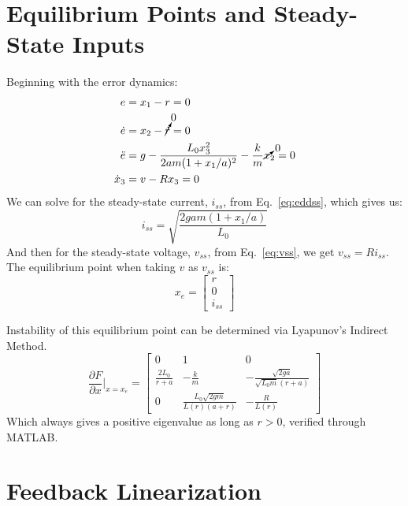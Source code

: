 \documentclass{article}
\begin{document}
\section{Equilibrium Points and Steady-State Inputs}
Beginning with the error dynamics:
\begin{align}
    e &= x_1 - r  = 0 \nonumber \\
    \dot{e} &= x_2 - \cancelto{0}{\dot{r}} = 0 \nonumber \\
    \ddot{e} &= g - \frac{L_0x_3^2}{2am(1 + x_1/a)^2} - \frac{k}{m}\cancelto{0}{x}_2 = 0 \label{eq:eddss} \\
    \dot{x}_3 &= v - Rx_3 = 0 \label{eq:vss}
\end{align}
We can solve for the steady-state current, $i_{ss}$, from Eq.~\ref{eq:eddss}, which gives us:
\begin{equation}
    i_{ss} = \sqrt{\frac{2gam(1+x_1/a)}{L_0}}
\end{equation}
And then for the steady-state voltage, $v_{ss}$, from Eq.~\ref{eq:vss}, we get $v_{ss} = Ri_{ss}$.
The equilibrium point when taking $v$ as $v_{ss}$ is:
\begin{equation}
    x_e = \begin{bmatrix} r \\ 0 \\ i_{ss} \end{bmatrix} \nonumber
\end{equation}
\par
\noindent
Instability of this equilibrium point can be determined via Lyapunov's Indirect Method.
\begin{equation*}
    \frac{\partial F}{\partial x}\Bigr|_{x = x_e} = \begin{bmatrix} 0 & 1 & 0 \\
                                                                    \frac{2L_0}{r+a} & -\frac{k}{m} & -\frac{\sqrt{2ga}}{\sqrt{L_0m}(r+a)} \\
                                                                    0 & \frac{L_0\sqrt{2gm}}{L(r)(a + r)} & -\frac{R}{L(r)}
                                                                \end{bmatrix}
\end{equation*}
Which always gives a positive eigenvalue as long as $r > 0$, verified through MATLAB.

\section{Feedback Linearization}
\end{document}
